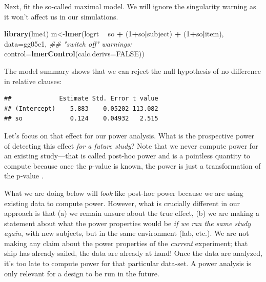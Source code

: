 \documentclass[12pt,]{krantz}
\newenvironment{Shaded}{\begin{snugshade}}{\end{snugshade}}
\newcommand{\CommentTok}[1]{\textcolor[rgb]{0.56,0.35,0.01}{\textit{#1}}}
\newcommand{\DataTypeTok}[1]{\textcolor[rgb]{0.13,0.29,0.53}{#1}}
\newcommand{\DecValTok}[1]{\textcolor[rgb]{0.00,0.00,0.81}{#1}}
\newcommand{\KeywordTok}[1]{\textcolor[rgb]{0.13,0.29,0.53}{\textbf{#1}}}
\newcommand{\NormalTok}[1]{#1}
\newcommand{\OperatorTok}[1]{\textcolor[rgb]{0.81,0.36,0.00}{\textbf{#1}}}
\newcommand{\OtherTok}[1]{\textcolor[rgb]{0.56,0.35,0.01}{#1}}
\newcommand{\StringTok}[1]{\textcolor[rgb]{0.31,0.60,0.02}{#1}}
\begin{document}
Next, fit the so-called maximal model. We will ignore the singularity warning as it won't affect us in our simulations.

\begin{Shaded}
\begin{Highlighting}[]
\KeywordTok{library}\NormalTok{(lme4)}
\NormalTok{m<-}\KeywordTok{lmer}\NormalTok{(logrt }\OperatorTok{~}\StringTok{ }\NormalTok{so }\OperatorTok{+}\StringTok{ }
\StringTok{          }\NormalTok{(}\DecValTok{1}\OperatorTok{+}\NormalTok{so}\OperatorTok{|}\NormalTok{subject) }\OperatorTok{+}\StringTok{ }
\StringTok{          }\NormalTok{(}\DecValTok{1}\OperatorTok{+}\NormalTok{so}\OperatorTok{|}\NormalTok{item), }
        \DataTypeTok{data=}\NormalTok{gg05e1,}
        \CommentTok{## "switch off" warnings:}
        \DataTypeTok{control=}\KeywordTok{lmerControl}\NormalTok{(}\DataTypeTok{calc.derivs=}\OtherTok{FALSE}\NormalTok{))}
\end{Highlighting}
\end{Shaded}

The model summary shows that we can reject the null hypothesis of no difference in relative clauses:

\begin{Shaded}
\end{Shaded}

\begin{verbatim}
##             Estimate Std. Error t value
## (Intercept)    5.883    0.05202 113.082
## so             0.124    0.04932   2.515
\end{verbatim}

Let's focus on that effect for our power analysis. What is the prospective power of detecting this effect \emph{for a future study}? Note that we never compute power for an existing study---that is called post-hoc power and is a pointless quantity to compute because once the p-value is known, the power is just a transformation of the p-value \citep{hoenigheisey}.

What we are doing below will \emph{look} like post-hoc power because we are using existing data to compute power. However, what is crucially different in our approach is that (a) we remain unsure about the true effect, (b) we are making a statement about what the power properties would be \emph{if we ran the same study again}, with new subjects, but in the same environment (lab, etc.). We are not making any claim about the power properties of the \emph{current} experiment; that ship has already sailed, the data are already at hand! Once the data are analyzed, it's too late to compute power for that particular data-set. A power analysis is only relevant for a design to be run in the future.
\end{document}
